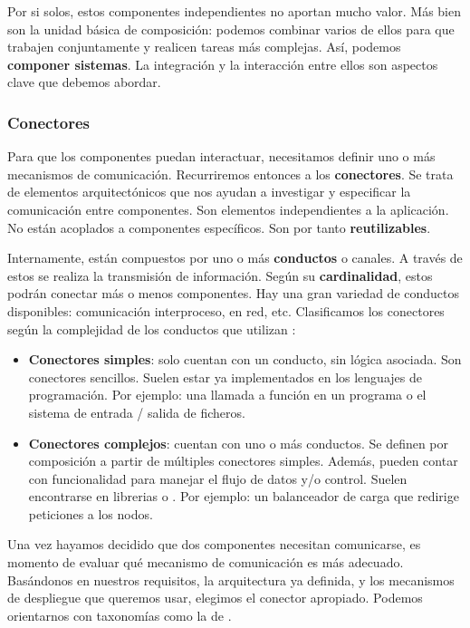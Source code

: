 Por si solos, estos componentes independientes no aportan mucho valor. Más bien son la unidad básica de composición: podemos combinar varios de ellos para que trabajen conjuntamente y realicen tareas más complejas. Así, podemos \textbf{componer sistemas}. \cite{mehtaTaxonomySoftwareConnectors2000} La integración y la interacción entre ellos son aspectos clave que debemos abordar.

\subsubsection{Conectores}

Para que los componentes puedan interactuar, necesitamos definir uno o más mecanismos de comunicación. Recurriremos entonces a los \textbf{conectores}. Se trata de elementos arquitectónicos que nos ayudan a investigar y especificar la comunicación entre componentes. \cite{perryFoundationsStudySoftware1992} Son elementos independientes a la aplicación. No están acoplados a componentes específicos. Son por tanto \textbf{reutilizables}. \cite{taylorComponentMessagebasedArchitectural1996a}

Internamente, están compuestos por uno o más \textbf{conductos} o canales. A través de estos se realiza la transmisión de información. Según su \textbf{cardinalidad}, estos podrán conectar más o menos componentes. Hay una gran variedad de conductos disponibles: comunicación interproceso, en red, etc. Clasificamos los conectores según la complejidad de los conductos que utilizan \cite{mehtaTaxonomySoftwareConnectors2000}:

\begin{itemize}
    \item \textbf{Conectores simples}: solo cuentan con un conducto, sin lógica asociada. Son conectores sencillos. Suelen estar ya implementados en los lenguajes de programación. Por ejemplo: una llamada a función en un programa o el sistema de entrada / salida de ficheros.

    \item \textbf{Conectores complejos}: cuentan con uno o más conductos. Se definen por composición a partir de múltiples conectores simples. Además, pueden contar con funcionalidad para manejar el flujo de datos y/o control. Suelen encontrarse en librerias o . Por ejemplo: un balanceador de carga que redirige peticiones a los nodos.
\end{itemize}

Una vez hayamos decidido que dos componentes necesitan comunicarse, es momento de evaluar qué mecanismo de comunicación es más adecuado. Basándonos en nuestros requisitos, la arquitectura ya definida, y los mecanismos de despliegue que queremos usar, elegimos el conector apropiado. Podemos orientarnos con taxonomías como la de \cite{mehtaTaxonomySoftwareConnectors2000}.

